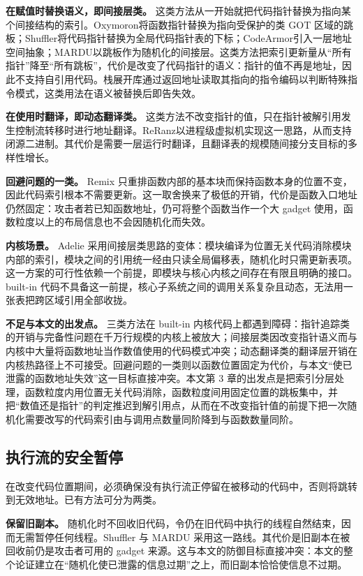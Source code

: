 \textbf{在赋值时替换语义，即间接层类。} 这类方法从一开始就把代码指针替换为指向某个间接结构的索引。Oxymoron\citep{backes2014oxymoron}将函数指针替换为指向受保护的类 GOT 区域的跳板；Shuffler\citep{williams2016shuffler}将代码指针替换为全局代码指针表的下标；CodeArmor\citep{chen2017codearmor}引入一层地址空间抽象；MARDU\citep{jelesnianski2020mardu}以跳板作为随机化的间接层。这类方法把索引更新量从“所有指针”降至“所有跳板”，代价是改变了代码指针的语义：指针的值不再是地址，因此不支持自引用代码。栈展开库通过返回地址读取其指向的指令编码以判断特殊指令模式，这类用法在语义被替换后即告失效。

\textbf{在使用时翻译，即动态翻译类。} 这类方法不改变指针的值，只在指针被解引用发生控制流转移时进行地址翻译。ReRanz\citep{wang2017reranz}以进程级虚拟机实现这一思路，从而支持闭源二进制。其代价是需要一层运行时翻译，且翻译表的规模随间接分支目标的多样性增长。

\textbf{回避问题的一类。} Remix 只重排函数内部的基本块而保持函数本身的位置不变，因此代码索引根本不需要更新。这一取舍换来了极低的开销，代价是函数入口地址仍然固定：攻击者若已知函数地址，仍可将整个函数当作一个大 gadget 使用，函数粒度以上的布局信息也不会因随机化而失效。

\textbf{内核场景。} Adelie 采用间接层类思路的变体：模块编译为位置无关代码消除模块内部的索引，模块之间的引用统一经由只读全局偏移表，随机化时只需更新表项。这一方案的可行性依赖一个前提，即模块与核心内核之间存在有限且明确的接口。built-in 代码不具备这一前提，核心子系统之间的调用关系复杂且动态，无法用一张表把跨区域引用全部收拢。

\textbf{不足与本文的出发点。} 三类方法在 built-in 内核代码上都遇到障碍：指针追踪类的开销与完备性问题在千万行规模的内核上被放大；间接层类因改变指针语义而与内核中大量将函数地址当作数值使用的代码模式冲突；动态翻译类的翻译层开销在内核热路径上不可接受。回避问题的一类则以函数位置固定为代价，与本文“使已泄露的函数地址失效”这一目标直接冲突。本文第 3 章的出发点是把索引分层处理，函数粒度内用位置无关代码消除，函数粒度间用固定位置的跳板集中，并把“数值还是指针”的判定推迟到解引用点，从而在不改变指针值的前提下把一次随机化需要改写的代码索引由与调用点数量同阶降到与函数数量同阶。

\subsection{执行流的安全暂停}

在改变代码位置期间，必须确保没有执行流正停留在被移动的代码中，否则将跳转到无效地址。已有方法可分为两类。

\textbf{保留旧副本。} 随机化时不回收旧代码，令仍在旧代码中执行的线程自然结束，因而无需暂停任何线程。Shuffler 与 MARDU 采用这一路线。其代价是旧副本在被回收前仍是攻击者可用的 gadget 来源。这与本文的防御目标直接冲突：本文的整个论证建立在“随机化使已泄露的信息过期”之上，而旧副本恰恰使信息不过期。

